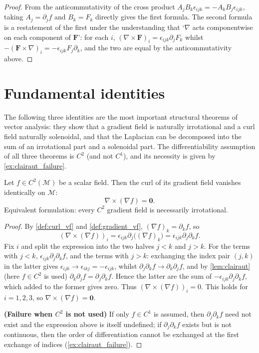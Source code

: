 \begin{proof}
From the anticommutativity of the cross product $A_jB_k\epsilon_{ijk}=-A_kB_j\epsilon_{ijk}$, taking $A_j=\partial_jf$ and $B_k=F_k$ directly gives the first formula. The second formula is a restatement of the first under the understanding that `$\nabla$ acts componentwise on each component of $\mathbf F$': for each $i$, $(\nabla\times\mathbf F)_i=\epsilon_{ijk}\partial_jF_k$ whilst $-(\mathbf F\times\nabla)_i=-\epsilon_{ijk}F_j\partial_k$, and the two are equal by the anticommutativity above.
\end{proof}

\section{Fundamental identities}

The following three identities are the most important structural theorems of vector analysis: they show that a gradient field is naturally irrotational and a curl field naturally solenoidal, and that the Laplacian can be decomposed into the sum of an irrotational part and a solenoidal part. The differentiability assumption of all three theorems is $C^2$ (and not $C^1$), and its necessity is given by \cref{ex:clairaut_failure}.

\begin{theorem}\label{thm:curl_grad_zero}
Let $f \in C^2(\mathcal{M})$ be a scalar field. Then the curl of its gradient field vanishes identically on $\mathcal{M}$:
\[
\nabla \times (\nabla f) = \mathbf{0}.
\]
Equivalent formulation: every $C^2$ gradient field is necessarily irrotational.
\end{theorem}

\begin{proof}
By \cref{def:curl_vf} and \cref{def:gradient_vf}, $(\nabla f)_k = \partial_kf$, so
\[
(\nabla\times(\nabla f))_i = \epsilon_{ijk}\partial_j\bigl((\nabla f)_k\bigr) = \epsilon_{ijk}\partial_j\partial_kf .
\]
Fix $i$ and split the expression into the two halves $j<k$ and $j>k$. For the terms with $j<k$, $\epsilon_{ijk}\partial_j\partial_kf$, and the terms with $j>k$: exchanging the index pair $(j,k)$ in the latter gives $\epsilon_{ijk}\to\epsilon_{ikj}=-\epsilon_{ijk}$, whilst $\partial_j\partial_kf\to\partial_k\partial_jf$, and by \cref{lem:clairaut} (here $f\in C^2$ is used) $\partial_k\partial_jf=\partial_j\partial_kf$. Hence the latter are the sum of $-\epsilon_{ijk}\partial_j\partial_kf$, which added to the former gives zero. Thus $(\nabla\times(\nabla f))_i=0$. This holds for $i=1,2,3$, so $\nabla\times(\nabla f)=\mathbf 0$.

\textbf{(Failure when $C^2$ is not used)} If only $f\in C^1$ is assumed, then $\partial_j\partial_kf$ need not exist and the expression above is itself undefined; if $\partial_j\partial_kf$ exists but is not continuous, then the order of differentiation cannot be exchanged at the first exchange of indices (\cref{ex:clairaut_failure}).
\end{proof}

